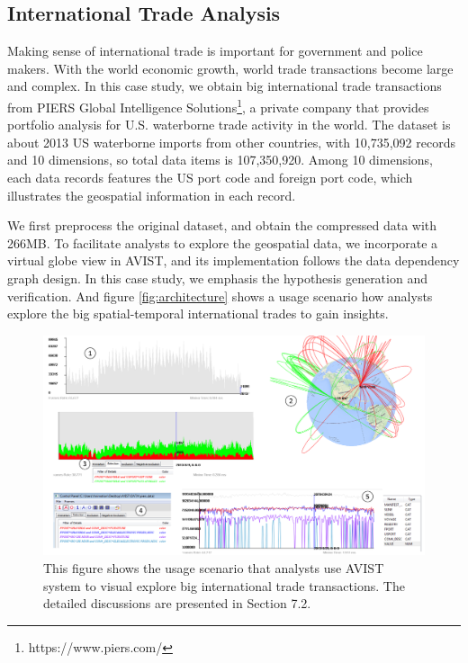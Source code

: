 \documentclass[journal]{vgtc}                %
\begin{document}
{\subsection{International Trade Analysis}
Making sense of international trade is important for government and police makers. With the world economic growth, world trade transactions become large and complex. In this case study, we obtain big international trade transactions from PIERS Global Intelligence Solutions\footnote{https://www.piers.com/}, a private company that provides portfolio analysis for U.S. waterborne trade activity in the world. The dataset is about 2013 US waterborne imports from other countries, with 10,735,092 records and 10 dimensions, so total data items is 107,350,920. Among 10 dimensions, each data records features the US port code and foreign port code, which illustrates the geospatial information in each record.

We first preprocess the original dataset, and obtain the compressed data with 266MB. To facilitate analysts to explore the geospatial data, we incorporate a virtual globe view in AVIST, and its implementation follows the data dependency graph design. In this case study, we emphasis the hypothesis generation and verification.
And figure \ref{fig:architecture} shows a usage scenario how analysts explore the big spatial-temporal international trades to gain insights.

\begin{figure}[htb]
	\centering
	\includegraphics[width=1.0\linewidth]{pic/worldtrade2.png}
	\parbox[t]{1.0\columnwidth}{\relax
	}
	\caption{\label{fig:network}
		This figure shows the usage scenario that analysts use AVIST system to visual explore big international trade transactions. The detailed discussions are presented in Section 7.2.}
\end{figure}

}
\end{document}
